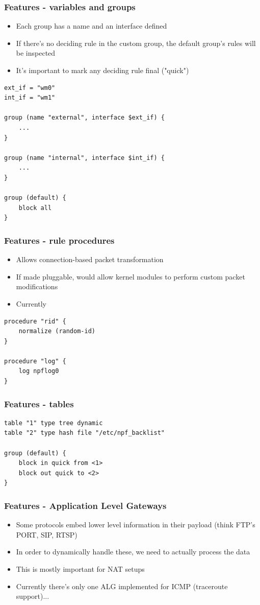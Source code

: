 \documentclass[magyar]{beamer}
\begin{document}
\begin{frame}[fragile]
\frametitle{Features - variables and groups}
\begin{itemize}
	\item Each group has a name and an interface defined
	\item If there's no deciding rule in the custom group, the default group's rules will be inspected
	\item It's important to mark any deciding rule final ("quick")
\end{itemize}
\begin{verbatim}
ext_if = "wm0"
int_if = "wm1"

group (name "external", interface $ext_if) {
    ...
}

group (name "internal", interface $int_if) {
    ...
}

group (default) {
    block all
}
\end{verbatim}
\end{frame}

\begin{frame}[fragile]
\frametitle{Features - rule procedures}
\begin{itemize}
	\item Allows connection-based packet transformation
	\item If made pluggable, would allow kernel modules to perform custom packet modifications
	\item Currently 
\end{itemize}
\begin{verbatim}
procedure "rid" {
    normalize (random-id)
}

procedure "log" {
    log npflog0
}
\end{verbatim}
\end{frame}

\begin{frame}[fragile]
\frametitle{Features - tables}
\begin{verbatim}
table "1" type tree dynamic
table "2" type hash file "/etc/npf_backlist"

group (default) {
    block in quick from <1>
    block out quick to <2>
}
\end{verbatim}
\end{frame}

\begin{frame}
\frametitle{Features - Application Level Gateways}
\begin{itemize}
	\item Some protocols embed lower level information in their payload (think FTP's PORT, SIP, RTSP)
	\item In order to dynamically handle these, we need to actually process the data
	\item This is mostly important for NAT setups
	\item Currently there's only one ALG implemented for ICMP (traceroute support)...
\end{itemize}
\end{frame}
\end{document}
